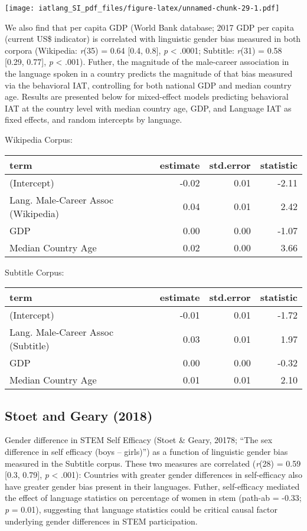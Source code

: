 \documentclass[]{article}
\begin{document}
\texttt{[image: iatlang\_SI\_pdf\_files/figure-latex/unnamed-chunk-29-1.pdf]}

We also find that per capita GDP (World Bank database; 2017 GDP per
capita (current US\$ indicator) is correlated with linguistic gender
bias measured in both corpora (Wikipedia: \emph{r}(35) = 0.64 {[}0.4,
0.8{]}, \emph{p} \textless{} .0001; Subtitle: \emph{r}(31) = 0.58
{[}0.29, 0.77{]}, \emph{p} \textless{} .001). Futher, the magnitude of
the male-career association in the language spoken in a country predicts
the magnitude of that bias measured via the behavioral IAT, controlling
for both national GDP and median country age. Results are presented
below for mixed-effect models predicting behavioral IAT at the country
level with median country age, GDP, and Language IAT as fixed effects,
and random intercepts by language.

Wikipedia Corpus:

\begin{tabular}{l|r|r|r}
\hline
term & estimate & std.error & statistic\\
\hline
(Intercept) & -0.02 & 0.01 & -2.11\\
\hline
Lang. Male-Career Assoc (Wikipedia) & 0.04 & 0.01 & 2.42\\
\hline
GDP & 0.00 & 0.00 & -1.07\\
\hline
Median Country Age & 0.02 & 0.00 & 3.66\\
\hline
\end{tabular}

Subtitle Corpus:

\begin{tabular}{l|r|r|r}
\hline
term & estimate & std.error & statistic\\
\hline
(Intercept) & -0.01 & 0.01 & -1.72\\
\hline
Lang. Male-Career Assoc (Subtitle) & 0.03 & 0.01 & 1.97\\
\hline
GDP & 0.00 & 0.00 & -0.32\\
\hline
Median Country Age & 0.01 & 0.01 & 2.10\\
\hline
\end{tabular}

\hypertarget{stoet-and-geary-2018}{%
\subsection{Stoet and Geary (2018)}\label{stoet-and-geary-2018}}

Gender difference in STEM Self Efficacy (Stoet \& Geary, 20178; ``The
sex difference in self efficacy (boys -- girls)'') as a function of
linguistic gender bias measured in the Subtitle corpus. These two
measures are correlated (\emph{r}(28) = 0.59 {[}0.3, 0.79{]}, \emph{p}
\textless{} .001): Countries with greater gender differences in
self-efficacy also have greater gender bias present in their languages.
Futher, self-efficacy mediated the effect of language statistics on
percentage of women in stem (path-ab = -0.33; \emph{p} = 0.01),
suggesting that language statistics could be critical causal factor
underlying gender differences in STEM participation.
\end{document}
